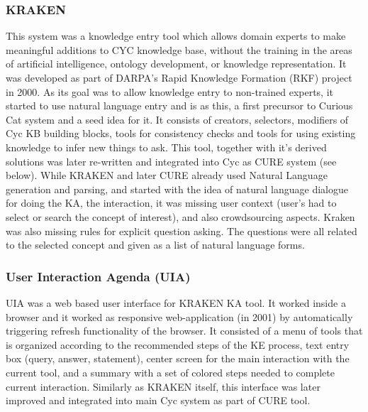 \subsubsection{KRAKEN}
\label{section:r:kraken}
This system was a knowledge entry tool which allows domain experts to
make meaningful additions to CYC knowledge base, without the training in the 
areas of artificial intelligence, ontology development, or knowledge
representation\parencite{Panton2002a}. It was developed as part of DARPA's
Rapid Knowledge Formation (RKF) project in 2000. As its goal was to allow
knowledge entry to non-trained experts, it started to use natural language 
entry and is as this, a first precursor to Curious Cat system and a seed idea
for it. It consists of creators, selectors, modifiers of Cyc KB building blocks,
tools for consistency checks and tools for using existing knowledge to infer new
things to ask. This tool, together with it's derived solutions was later 
re-written and integrated into Cyc as CURE system (see below). While KRAKEN and
later CURE already used Natural Language generation and parsing, and started 
with the idea of natural language dialogue for doing the KA, the interaction, it
was missing user context (user's had to select or search the concept of 
interest), and also crowdsourcing aspects. Kraken was also missing rules for
explicit question asking. The questions were all related to the selected concept
and given as a list of natural language forms.

\subsubsection{User Interaction Agenda (UIA)} 
\label{section:r:uia}
UIA was a web  based user interface for KRAKEN
KA tool\parencite{Panton2002a,Witbrock2003UIA}. It worked inside a browser and 
it worked as responsive web-application (in 2001) by automatically triggering refresh 
functionality of the browser. It consisted of a menu of tools that is organized
according to the recommended steps of the KE process, text entry box (query, 
answer, statement), center screen for the main interaction with the current 
tool, and a summary with a set of colored steps needed to complete current 
interaction. Similarly as KRAKEN itself, this interface was later improved
and integrated into main Cyc system as part of CURE tool. 

